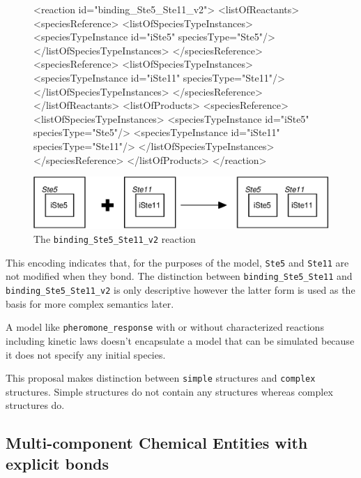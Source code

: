 \documentclass{cekarticle}
\begin{document}
\begin{figure}[h]
\begin{example}
<reaction id="binding_Ste5_Ste11_v2">
    <listOfReactants>
        <speciesReference>
            <listOfSpeciesTypeInstances>
                <speciesTypeInstance id="iSte5" speciesType="Ste5"/>
            </listOfSpeciesTypeInstances>
        </speciesReference>
        <speciesReference>
            <listOfSpeciesTypeInstances>
                <speciesTypeInstance id="iSte11" speciesType="Ste11"/>
            </listOfSpeciesTypeInstances>
        </speciesReference>
    </listOfReactants>
    <listOfProducts>
        <speciesReference>
            <listOfSpeciesTypeInstances>
                <speciesTypeInstance id="iSte5" speciesType="Ste5"/>
                <speciesTypeInstance id="iSte11" speciesType="Ste11"/>
            </listOfSpeciesTypeInstances>
        </speciesReference>
    </listOfProducts>
</reaction>
\end{example}
  \vspace*{8pt}
  \centering
  \includegraphics[scale = 0.7]{binding_Ste5_Ste11_v2.eps}
  \caption{The \texttt{binding\_Ste5\_Ste11\_v2} reaction}
  \label{fig:binding_Ste5_Ste11_v2}
\end{figure}

This encoding indicates that, for the purposes of the model, \texttt{Ste5} and \texttt{Ste11}
are not modified when they bond.  The distinction between \texttt{binding\_Ste5\_Ste11}
and \texttt{binding\_Ste5\_Ste11\_v2} is only descriptive however the latter form
is used as the basis for more complex semantics later.

A model like \texttt{pheromone\_response} with or without characterized reactions including kinetic laws
doesn't encapsulate a model that can be simulated because it does not specify any initial species.

This proposal makes distinction between \texttt{simple}  structures and
\texttt{complex}  structures.  Simple  structures
do not contain any  structures whereas complex  structures
do.

\subsection{Multi-component Chemical Entities with explicit bonds}
\label{sec:explicitbonds}
\end{document}
